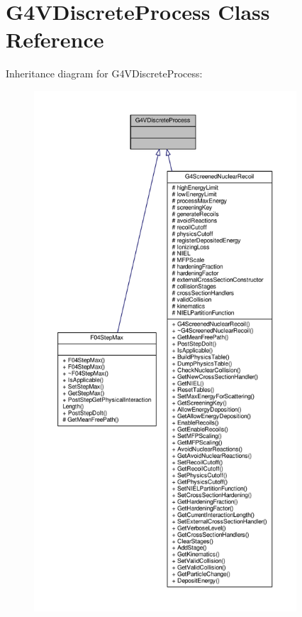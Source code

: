 \hypertarget{classG4VDiscreteProcess}{}\section{G4\+V\+Discrete\+Process Class Reference}
\label{classG4VDiscreteProcess}


Inheritance diagram for G4\+V\+Discrete\+Process\+:
\nopagebreak
\begin{figure}[H]
\begin{center}
\leavevmode
\includegraphics[height=550pt]{classG4VDiscreteProcess__inherit__graph}
\end{center}
\end{figure}


